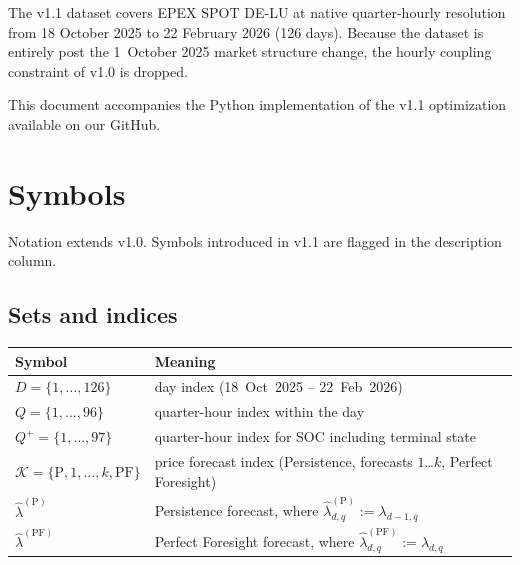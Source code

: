 \documentclass{article}
\numberwithin{equation}{subsection}
\begin{document}
The v1.1 dataset covers EPEX SPOT DE-LU at native quarter-hourly resolution from 18 October 2025 to 22 February 2026 (126 days). Because the dataset is entirely post the 1~October 2025 market structure change, the hourly coupling constraint of v1.0 is dropped.

This document accompanies the Python implementation of the v1.1 optimization available on our GitHub.


\section*{Symbols}
Notation extends v1.0. Symbols introduced in v1.1 are flagged in the description column.

\subsection*{Sets and indices}
\begin{tabular}{@{}ll@{}}
\toprule
Symbol & Meaning \\
\midrule
\(D=\{1,\dots,126\}\) & day index (18~Oct~2025 -- 22~Feb~2026) \\
\(Q=\{1,\dots,96\}\) & quarter-hour index within the day \\
\(Q^{+}=\{1,\dots,97\}\) & quarter-hour index for SOC including terminal state \\
\(\mathcal{K}=\{\mathrm{P},1,\dots,k,\mathrm{PF}\}\) & price forecast index (Persistence, forecasts \(1\)\dots\(k\), Perfect Foresight) \\
\(\hat{\lambda}^{(\mathrm{P})}\) & Persistence forecast, where \(\hat{\lambda}^{(\mathrm{P})}_{d,q}:=\lambda_{d-1,q}\) \\
\(\hat{\lambda}^{(\mathrm{PF})}\) & Perfect Foresight forecast, where \(\hat{\lambda}^{(\mathrm{PF})}_{d,q}:=\lambda_{d,q}\) \\
\bottomrule
\end{tabular}
\end{document}
